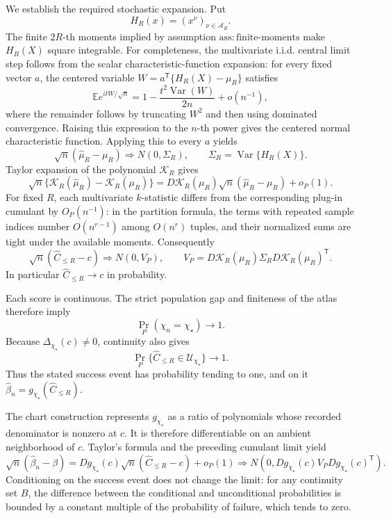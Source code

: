 We establish the required stochastic expansion.  Put
\[
 H_R(x)=(x^\nu)_{\nu\in\mathcal A_R}.
\]
The finite \(2R\)-th moments implied by assumption \(\mathrm{ass:finite\mbox{-}moments}\) make \(H_R(X)\) square integrable.  For completeness, the multivariate i.i.d. central limit step follows from the scalar characteristic-function expansion: for every fixed vector \(a\), the centered variable \(W=a^{\mathsf T}\{H_R(X)-\mu_R\}\) satisfies
\[
 \mathbb E e^{itW/\sqrt n}
 =1-\frac{t^2\operatorname{Var}(W)}{2n}+o(n^{-1}),
\]
where the remainder follows by truncating \(W^2\) and then using dominated convergence.  Raising this expression to the \(n\)-th power gives the centered normal characteristic function.  Applying this to every \(a\) yields
\[
 \sqrt n(\widehat\mu_R-\mu_R)\Rightarrow N(0,\Sigma_R),
 \qquad \Sigma_R=\operatorname{Var}\{H_R(X)\}.
\]
Taylor expansion of the polynomial \(\mathcal K_R\) gives
\[
 \sqrt n\{\mathcal K_R(\widehat\mu_R)-\mathcal K_R(\mu_R)\}
 =D\mathcal K_R(\mu_R)\sqrt n(\widehat\mu_R-\mu_R)+o_P(1).
\]
For fixed \(R\), each multivariate \(k\)-statistic differs from the corresponding plug-in cumulant by \(O_P(n^{-1})\): in the partition formula, the terms with repeated sample indices number \(O(n^{r-1})\) among \(O(n^r)\) tuples, and their normalized sums are tight under the available moments.  Consequently
\[
 \sqrt n(\widehat C_{\le R}-c)\Rightarrow N(0,V_P),
 \qquad
 V_P=D\mathcal K_R(\mu_R)\Sigma_RD\mathcal K_R(\mu_R)^{\mathsf T}.
\]
In particular \(\widehat C_{\le R}\to c\) in probability.

Each score is continuous.  The strict population gap and finiteness of the atlas therefore imply
\[
 \Pr_P(\chi_n=\chi_\star)\longrightarrow1.
\]
Because \(\Delta_{\chi_\star}(c)\ne0\), continuity also gives
\[
 \Pr_P\{\widehat C_{\le R}\in\mathcal U_{\chi_\star}\}\longrightarrow1.
\]
Thus the stated success event has probability tending to one, and on it \(\widehat\beta_n=g_{\chi_\star}(\widehat C_{\le R})\).

The chart construction represents \(g_{\chi_\star}\) as a ratio of polynomials whose recorded denominator is nonzero at \(c\).  It is therefore differentiable on an ambient neighborhood of \(c\).  Taylor's formula and the preceding cumulant limit yield
\[
 \sqrt n(\widehat\beta_n-\beta)
 =Dg_{\chi_\star}(c)\sqrt n(\widehat C_{\le R}-c)+o_P(1)
 \Rightarrow
 N\!\left(0,Dg_{\chi_\star}(c)V_PDg_{\chi_\star}(c)^{\mathsf T}\right).
\]
Conditioning on the success event does not change the limit: for any continuity set \(B\), the difference between the conditional and unconditional probabilities is bounded by a constant multiple of the probability of failure, which tends to zero.

